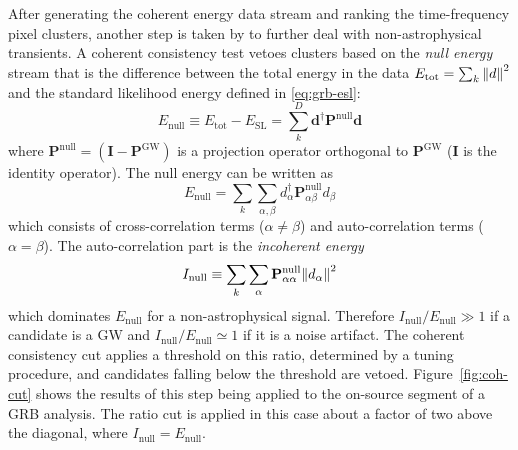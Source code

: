After generating the coherent energy data stream and ranking the time-frequency pixel clusters, another step is taken by \xpip to further deal with non-astrophysical transients.
A coherent consistency test vetoes clusters based on the \textit{null energy} stream that is the difference between the total energy in the data $E_{\mathrm{tot}} = \sum_k \norm{d}^2$ and the standard likelihood energy defined in \cref{eq:grb-esl}:
\begin{equation}
	E_{\mathrm{null}} \equiv E_{\mathrm{tot}} - E_{\mathrm{SL}} = \sum_k^D \mathbf{d}^{\dagger} \mathbf{P}^{\textrm{null}} \mathbf{d}
\end{equation}
where $\mathbf{P}^{\textrm{null}} = (\mathbf{I} - \mathbf{P}^{\mathrm{GW}})$ is a projection operator orthogonal to $\mathbf{P}^{\mathrm{GW}}$ ($\mathbf{I}$ is the identity operator).
The null energy can be written as
\begin{equation}
	E_{\mathrm{null}} = \sum_k \sum_{\alpha, \beta} d_{\alpha}^{\dagger}  \mathbf{P}^{\textrm{null}}_{\alpha \beta} d_{\beta}
\end{equation}
which consists of cross-correlation terms ($\alpha \neq \beta$) and auto-correlation terms ($\alpha = \beta$).
The auto-correlation part is the \textit{incoherent energy}
\begin{equation}
	I_{\mathrm{null}} \equiv \sum_k \sum_{\alpha} \mathbf{P}^{\textrm{null}}_{\alpha \alpha} \norm{d_\alpha}^2
\end{equation}
which dominates $E_{\mathrm{null}}$ for a non-astrophysical signal.
Therefore $I_{\mathrm{null}} / E_{\mathrm{null}} \gg 1$ if a candidate is a GW and $I_{\mathrm{null}} / E_{\mathrm{null}} \simeq 1$ if it is a noise artifact.
The coherent consistency cut applies a threshold on this ratio, determined by a tuning procedure, and candidates falling below the threshold are vetoed.
Figure~\ref{fig:coh-cut} shows the results of this step being applied to the on-source segment of a GRB analysis.
The ratio cut is applied in this case about a factor of two above the diagonal, where $I_{\mathrm{null}} = E_{\mathrm{null}}$.

